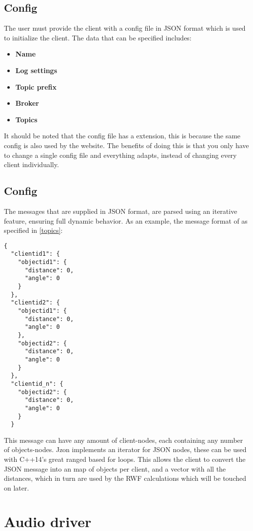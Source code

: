 \subsection{Config}
The user must provide the client with a config file in JSON format which is used to initialize the client. The data that can be specified includes:
\small{
\begin{itemize} [noitemsep, nolistsep]
	\item \textbf {Name}
	\item \textbf {Log settings}
	\item \textbf {Topic prefix}
	\item \textbf {Broker}
	\item \textbf {Topics\\}
\end{itemize}
}
It should be noted that the config file has a  extension, this is because the same config is also used by the website. The benefits of doing this is that you only have to change a single config file and everything adapts, instead of changing every client individually.

\subsection{Config}
The messages that are supplied in JSON format, are parsed using an iterative feature, ensuring full dynamic behavior. As an example, the message format of  as specified in \ref{topics}:
\begin{lstlisting}
{
  "clientid1": {
    "objectid1": {
      "distance": 0,
      "angle": 0
    }
  },
  "clientid2": {
    "objectid1": {
      "distance": 0,
      "angle": 0
    },
    "objectid2": {
      "distance": 0,
      "angle": 0
    }
  },
  "clientid_n": {
    "objectid2": {
      "distance": 0,
      "angle": 0
    }
  }
\end{lstlisting}

This message can have any amount  of client-nodes, each containing any number  of objects-nodes. Jzon implements an iterator for JSON nodes, these can be used with C++14's great ranged based for loops. This allows the client to convert the JSON message into an map of objects per client, and a vector with all the distances, which in turn are used by the RWF calculations which will be touched on later.

\section{Audio driver}
\label{sec:client_audio_driver}

